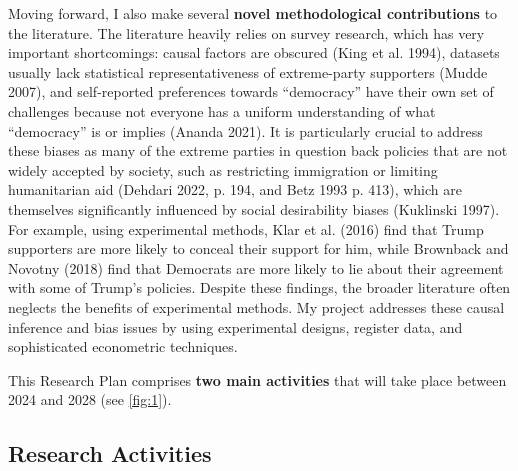 \documentclass[letterpaper]{article}
\begin{document}
\vspace{2mm}Moving forward, I also make several {\bf novel methodological contributions} to the literature. The literature heavily relies on survey research, which has very important shortcomings: causal factors are obscured (King et al. 1994), datasets usually lack statistical representativeness of extreme-party supporters (Mudde 2007), and self-reported preferences towards ``democracy'' have their own set of challenges because not everyone has a uniform understanding of what ``democracy'' is or implies (Ananda 2021). It is particularly crucial to address these biases as many of the extreme parties in question back policies that are not widely accepted by society, such as restricting immigration or limiting humanitarian aid (Dehdari 2022, p. 194, and Betz 1993 p. 413), which are themselves significantly influenced by social desirability biases (Kuklinski 1997). For example, using experimental methods, Klar et al. (2016) find that Trump supporters are more likely to conceal their support for him, while Brownback and Novotny (2018) find that Democrats are more likely to lie about their agreement with some of Trump's policies. Despite these findings, the broader literature often neglects the benefits of experimental methods. My project addresses these causal inference and bias issues by using experimental designs, register data, and sophisticated econometric techniques. 

{\color{red}This Research Plan comprises {\bf two main activities} that will take place between 2024 and 2028} (see \autoref{fig:1}).

\subsection*{Research Activities}
\end{document}
